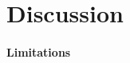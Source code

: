 \documentclass[	
	12pt, %
	a4paper, %
  abstracton
]{scrartcl}\usepackage[]{graphicx}\usepackage[]{color}
\begin{document}
\section*{Discussion}
\paragraph{Limitations}
\end{document}
